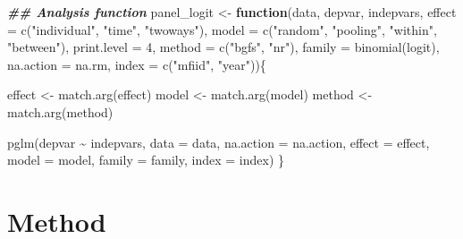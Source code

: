 \documentclass[a4paper,nobind]{templates/ociamthesis}
\newenvironment{Shaded}{\begin{snugshade}}{\end{snugshade}}
\newcommand{\AttributeTok}[1]{\textcolor[rgb]{0.77,0.63,0.00}{#1}}
\newcommand{\ControlFlowTok}[1]{\textcolor[rgb]{0.13,0.29,0.53}{\textbf{#1}}}
\newcommand{\DecValTok}[1]{\textcolor[rgb]{0.00,0.00,0.81}{#1}}
\newcommand{\DocumentationTok}[1]{\textcolor[rgb]{0.56,0.35,0.01}{\textbf{\textit{#1}}}}
\newcommand{\FunctionTok}[1]{\textcolor[rgb]{0.00,0.00,0.00}{#1}}
\newcommand{\NormalTok}[1]{#1}
\newcommand{\OtherTok}[1]{\textcolor[rgb]{0.56,0.35,0.01}{#1}}
\newcommand{\SpecialCharTok}[1]{\textcolor[rgb]{0.00,0.00,0.00}{#1}}
\newcommand{\StringTok}[1]{\textcolor[rgb]{0.31,0.60,0.02}{#1}}
\renewenvironment{Shaded}
{
  \vspace{10pt}%
  \begin{snugshade}%
}{%
  \end{snugshade}%
  \vspace{8pt}%
}
\begin{document}
\begin{Shaded}
\begin{Highlighting}[]
\DocumentationTok{\#\# Analysis function}
\NormalTok{panel\_logit }\OtherTok{\textless{}{-}} \ControlFlowTok{function}\NormalTok{(data, depvar, indepvars,}
                        \AttributeTok{effect =} \FunctionTok{c}\NormalTok{(}\StringTok{"individual"}\NormalTok{, }\StringTok{"time"}\NormalTok{, }\StringTok{"twoways"}\NormalTok{),}
                        \AttributeTok{model =} \FunctionTok{c}\NormalTok{(}\StringTok{"random"}\NormalTok{, }\StringTok{"pooling"}\NormalTok{, }\StringTok{"within"}\NormalTok{, }\StringTok{"between"}\NormalTok{),}
                        \AttributeTok{print.level =} \DecValTok{4}\NormalTok{,}
                        \AttributeTok{method =} \FunctionTok{c}\NormalTok{(}\StringTok{"bgfs"}\NormalTok{, }\StringTok{"nr"}\NormalTok{),}
                        \AttributeTok{family =} \FunctionTok{binomial}\NormalTok{(}\StringTok{\textquotesingle{}logit\textquotesingle{}}\NormalTok{),}
                        \AttributeTok{na.action =}\NormalTok{ na.rm, }
                        \AttributeTok{index =} \FunctionTok{c}\NormalTok{(}\StringTok{"mfiid"}\NormalTok{, }\StringTok{"year"}\NormalTok{))\{}
 
\NormalTok{   effect }\OtherTok{\textless{}{-}} \FunctionTok{match.arg}\NormalTok{(effect)}
\NormalTok{   model }\OtherTok{\textless{}{-}} \FunctionTok{match.arg}\NormalTok{(model)}
\NormalTok{   method }\OtherTok{\textless{}{-}} \FunctionTok{match.arg}\NormalTok{(method)}
   
  \FunctionTok{pglm}\NormalTok{(depvar }\SpecialCharTok{\textasciitilde{}}\NormalTok{ indepvars, }
       \AttributeTok{data =}\NormalTok{ data, }
       \AttributeTok{na.action =}\NormalTok{ na.action, }
       \AttributeTok{effect =}\NormalTok{ effect,}
       \AttributeTok{model =}\NormalTok{ model, }
       \AttributeTok{family =}\NormalTok{ family, }
       \AttributeTok{index =}\NormalTok{ index)}
\NormalTok{\}}
\end{Highlighting}
\end{Shaded}

\hypertarget{method}{%
\section{Method}\label{method}}
\end{document}

